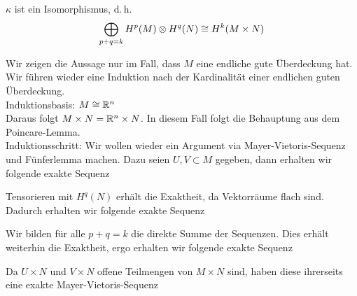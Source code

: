 $\kappa$ ist ein Isomorphismus, d.\,h.
\begin{align*}
\bigoplus_{p+q = k} H^p(M) \otimes H^q(N) \overset{}{\cong} H^{k}(M\times N)
\end{align*}
\begin{Beweis}{}
Wir zeigen die Aussage nur im Fall, dass $M$ eine endliche gute Überdeckung hat.\\
Wir führen wieder eine Induktion nach der Kardinalität einer endlichen guten Überdeckung.\\
Induktionsbasis: $M \overset{}{\cong} \mathbb{R}^n$\\
Daraus folgt $M\times N = \mathbb{R}^n \times N$. In diesem Fall folgt die Behauptung aus dem Poincare-Lemma.\\
Induktionsschritt: Wir wollen wieder ein Argument via Mayer-Vietoris-Sequenz und Fünferlemma machen. Dazu seien $U,V\subset M$ gegeben, dann erhalten wir folgende exakte Sequenz
\begin{center}
\end{center}
Tensorieren mit $H^q(N)$ erhält die Exaktheit, da Vektorräume flach sind. Dadurch erhalten wir folgende exakte Sequenz
\begin{center}
\end{center}
Wir bilden für alle $p+q = k$ die direkte Summe der Sequenzen. Dies erhält weiterhin die Exaktheit, ergo erhalten wir folgende exakte Sequenz
\begin{center}
\end{center}
Da $U\times N$ und $V\times N$ offene Teilmengen von $M\times N$ sind, haben diese ihrerseits eine exakte Mayer-Vietoris-Sequenz

\end{Beweis}
